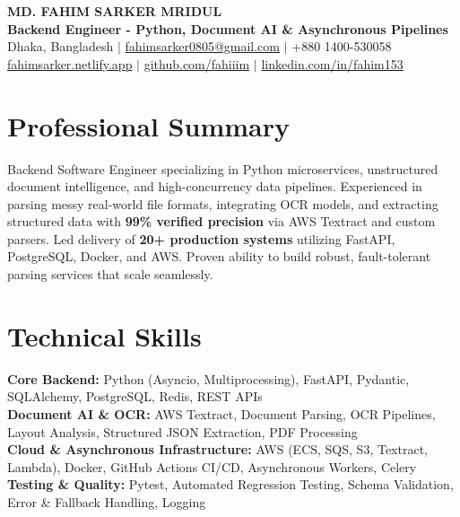 \documentclass[9.5pt,a4paper]{article}
\begin{document}
{\centering
    {\Large \textbf{MD. FAHIM SARKER MRIDUL}}\\[1pt]
    \textbf{Backend Engineer - Python, Document AI \& Asynchronous Pipelines}\\[1pt]
    Dhaka, Bangladesh \;$\vert$\; \href{mailto:fahimsarker0805@gmail.com}{fahimsarker0805@gmail.com} \;$\vert$\; +880 1400-530058\\[1pt]
    \href{https://fahimsarker.netlify.app}{fahimsarker.netlify.app} \;$\vert$\; \href{https://github.com/fahiiim}{github.com/fahiiim} \;$\vert$\; \href{https://linkedin.com/in/fahim153}{linkedin.com/in/fahim153}\par
}

\vspace{-2.5pt}
\section*{Professional Summary}
Backend Software Engineer specializing in Python microservices, unstructured document intelligence, and high-concurrency data pipelines. Experienced in parsing messy real-world file formats, integrating OCR models, and extracting structured data with \textbf{99\% verified precision} via AWS Textract and custom parsers. Led delivery of \textbf{20+ production systems} utilizing FastAPI, PostgreSQL, Docker, and AWS. Proven ability to build robust, fault-tolerant parsing services that scale seamlessly.

\section*{Technical Skills}
\noindent
\textbf{Core Backend:} Python (Asyncio, Multiprocessing), FastAPI, Pydantic, SQLAlchemy, PostgreSQL, Redis, REST APIs\\
\textbf{Document AI \& OCR:} AWS Textract, Document Parsing, OCR Pipelines, Layout Analysis, Structured JSON Extraction, PDF Processing\\
\textbf{Cloud \& Asynchronous Infrastructure:} AWS (ECS, SQS, S3, Textract, Lambda), Docker, GitHub Actions CI/CD, Asynchronous Workers, Celery\\
\textbf{Testing \& Quality:} Pytest, Automated Regression Testing, Schema Validation, Error \& Fallback Handling, Logging
\end{document}
